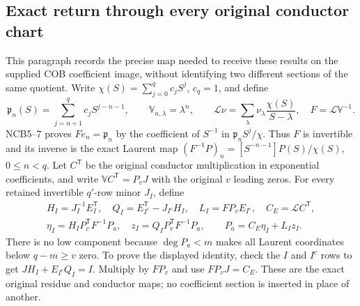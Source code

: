 \subsection{Exact return through every original conductor chart}
This paragraph records the precise map needed to receive these
results on the supplied COB coefficient image, without identifying
two different sections of the same quotient. Write
$\chi(S)=\sum_{j=0}^qc_jS^j$, $c_q=1$, and define
\[
\mathfrak p_n(S)=\sum_{j=n+1}^qc_jS^{j-n-1},\qquad
\mathbb V_{n,\lambda}=\lambda^n,\qquad
\mathcal L\nu=\sum_\lambda\nu_\lambda\frac{\chi(S)}{S-\lambda},
\quad F=\mathcal L\mathbb V^{-1}.
\tag{RBV26}
\]
NCB5--7 proves $Fe_n=\mathfrak p_n$ by the coefficient of $S^{-1}$
in $\mathfrak p_nS^j/\chi$. Thus $F$ is invertible and its inverse is
the exact Laurent map
$(F^{-1}P)_n=[S^{-n-1}]P(S)/\chi(S)$, $0\le n<q$.
Let $C^{\mathsf T}$ be the original conductor multiplication in
exponential coefficients, and write
$\mathbb VC^{\mathsf T}=P_vJ$ with the original $v$ leading zeros.
For every retained invertible $q'$-row minor $J_I$, define
\[
\begin{gathered}
H_I=J_I^{-1}E_I^{\mathsf T},\quad
Q_I=E_{I^c}^{\mathsf T}-J_{I^c}H_I,\quad
L_I=FP_vE_{I^c},\quad C_E=\mathcal LC^{\mathsf T},\\
\eta_I=H_IP_v^{\mathsf T}F^{-1}P_a,\quad
z_I=Q_IP_v^{\mathsf T}F^{-1}P_a,\qquad
\boxed{P_a=C_E\eta_I+L_Iz_I.}
\end{gathered}\tag{RBV27}
\]
There is no low component because $\deg P_a<m$ makes all Laurent
coordinates below $q-m\ge v$ zero. To prove the displayed identity,
check the $I$ and $I^c$ rows to get
$JH_I+E_{I^c}Q_I=I$. Multiply by $FP_v$ and use
$FP_vJ=C_E$. These are the exact original residue and conductor maps;
no coefficient section is inserted in place of another.

